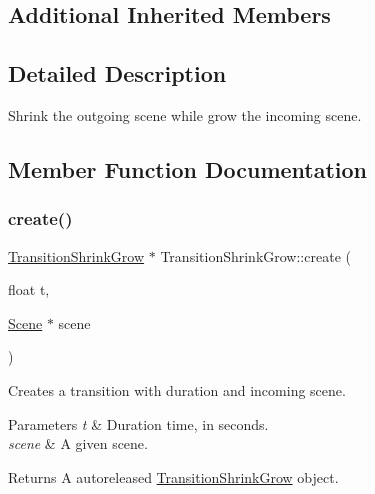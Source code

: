 \subsection*{Additional Inherited Members}


\subsection{Detailed Description}
Shrink the outgoing scene while grow the incoming scene. 

\subsection{Member Function Documentation}
\mbox{\label{classTransitionShrinkGrow_a524886b8f3e704f07a07e2fa024d10bb}} 
\subsubsection{\texorpdfstring{create()}{create()}\hspace{0.1cm}{\footnotesize\ttfamily [1/2]}}
{\footnotesize\ttfamily \hyperlink{classTransitionShrinkGrow}{Transition\+Shrink\+Grow} $\ast$ Transition\+Shrink\+Grow\+::create (\begin{DoxyParamCaption}\item[{float}]{t,  }\item[{\hyperlink{classScene}{Scene} $\ast$}]{scene }\end{DoxyParamCaption})\hspace{0.3cm}{\ttfamily [static]}}

Creates a transition with duration and incoming scene.


\begin{DoxyParams}{Parameters}
{\em t} & Duration time, in seconds. \\
\hline
{\em scene} & A given scene. \\
\hline
\end{DoxyParams}
\begin{DoxyReturn}{Returns}
A autoreleased \hyperlink{classTransitionShrinkGrow}{Transition\+Shrink\+Grow} object. 
\end{DoxyReturn}
\mbox{\label{classTransitionShrinkGrow_a3abaa5b662b31c26e5480f2204c6d8d9}} 
